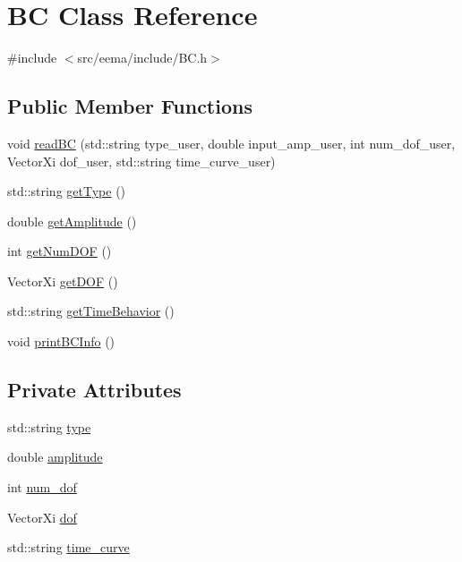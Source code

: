 \hypertarget{class_b_c}{}\section{BC Class Reference}
\label{class_b_c}


{\ttfamily \#include $<$src/eema/include/\+B\+C.\+h$>$}

\subsection*{Public Member Functions}
\begin{DoxyCompactItemize}
\item 
void \hyperlink{class_b_c_a8ceaa781f98b4128fa50611ff9481e1a}{read\+BC} (std\+::string type\+\_\+user, double input\+\_\+amp\+\_\+user, int num\+\_\+dof\+\_\+user, Vector\+Xi dof\+\_\+user, std\+::string time\+\_\+curve\+\_\+user)
\item 
std\+::string \hyperlink{class_b_c_aa6afb3d4586f395578bef89c77e60449}{get\+Type} ()
\item 
double \hyperlink{class_b_c_ad648545e6ee046075350cd9b3c88e610}{get\+Amplitude} ()
\item 
int \hyperlink{class_b_c_a6e42c3db5c67435bf2616768959866e9}{get\+Num\+D\+OF} ()
\item 
Vector\+Xi \hyperlink{class_b_c_a0bc8eb90956a082ada5e4daa5e32c9fc}{get\+D\+OF} ()
\item 
std\+::string \hyperlink{class_b_c_a3590d0a29a9261d99f21ee75340e5722}{get\+Time\+Behavior} ()
\item 
void \hyperlink{class_b_c_a7f2fb6f9d3848e8f0617902b3fb804af}{print\+B\+C\+Info} ()
\end{DoxyCompactItemize}
\subsection*{Private Attributes}
\begin{DoxyCompactItemize}
\item 
std\+::string \hyperlink{class_b_c_ab25297125dceec52f445a3a5efa77784}{type}
\item 
double \hyperlink{class_b_c_a25d7def8fdf5e988602759608b1507ea}{amplitude}
\item 
int \hyperlink{class_b_c_a71fe2e36793286c4e683a3d8485abaf2}{num\+\_\+dof}
\item 
Vector\+Xi \hyperlink{class_b_c_a4e53c8862da8b017b419b201911d9e00}{dof}
\item 
std\+::string \hyperlink{class_b_c_a84f989feaa5e81214f17b6dbdd1cf2ab}{time\+\_\+curve}
\end{DoxyCompactItemize}



